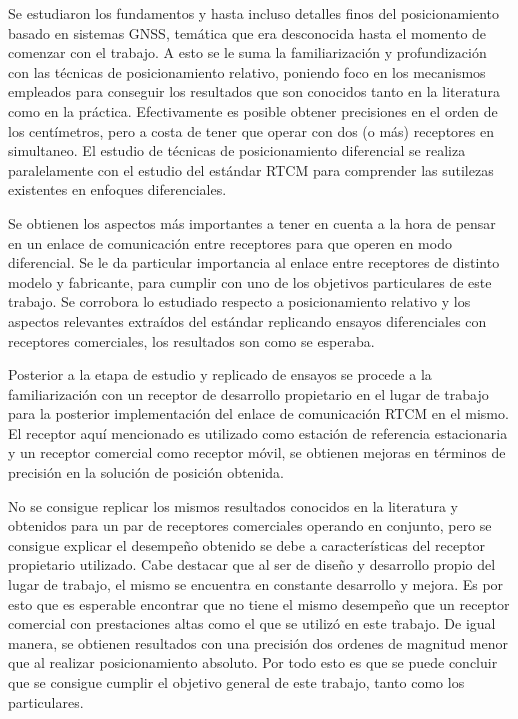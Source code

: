 \documentclass[a4paper,12pt,oneside,onecolumn,final,openright]{book}%
\begin{document}
	Se estudiaron los fundamentos y hasta incluso detalles finos del posicionamiento basado en sistemas GNSS, temática que era desconocida hasta el momento de comenzar con el trabajo. A esto se le suma la familiarización y profundización con las técnicas de posicionamiento relativo, poniendo foco en los mecanismos empleados para conseguir los resultados que son conocidos tanto en la literatura como en la práctica. Efectivamente es posible obtener precisiones en el orden de los centímetros, pero a costa de tener que operar con dos (o más) receptores en simultaneo. El estudio de técnicas de posicionamiento diferencial se realiza paralelamente con el estudio del estándar RTCM para comprender las sutilezas existentes en enfoques diferenciales.
	
	Se obtienen los aspectos más importantes a tener en cuenta a la hora de pensar en un enlace de comunicación entre receptores para que operen en modo diferencial. Se le da particular importancia al enlace entre receptores de distinto modelo y fabricante, para cumplir con uno de los objetivos particulares de este trabajo. Se corrobora lo estudiado respecto a posicionamiento relativo y los aspectos relevantes extraídos del estándar replicando ensayos diferenciales con receptores comerciales, los resultados son como se esperaba. 
	
	Posterior a la etapa de estudio y replicado de ensayos se procede a la familiarización con un receptor de desarrollo propietario en el lugar de trabajo para la posterior implementación del enlace de comunicación RTCM en el mismo.  El receptor aquí mencionado es utilizado como estación de referencia estacionaria y un receptor comercial como receptor móvil, se obtienen mejoras en términos de precisión en la solución de posición obtenida. 
	
	No se consigue replicar los mismos resultados conocidos en la literatura y obtenidos para un par de receptores comerciales operando en conjunto, pero se consigue explicar el desempeño obtenido se debe a características del receptor propietario utilizado. Cabe destacar que al ser de diseño y desarrollo propio del lugar de trabajo, el mismo se encuentra en constante desarrollo y mejora. Es por esto que es esperable encontrar que no tiene el mismo desempeño que un receptor comercial con prestaciones altas como el que se utilizó en este trabajo. De igual manera, se obtienen resultados con una precisión dos ordenes de magnitud menor que al realizar posicionamiento absoluto. Por todo esto es que se puede concluir que se consigue cumplir el objetivo general de este trabajo, tanto como los particulares. 
	
\end{document}

